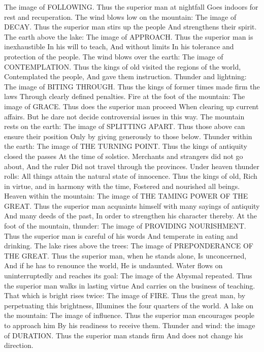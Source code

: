 {The image of FOLLOWING.
Thus the superior man at nightfall
Goes indoors for rest and recuperation.
\or
The wind blows low on the mountain:
The image of DECAY.
Thus the superior man stirs up the people
And strengthens their spirit.
\or
The earth above the lake:
The image of APPROACH.
Thus the superior man is inexhaustible
In his will to teach,
And without limits
In his tolerance and protection of the people.
\or
The wind blows over the earth:
The image of CONTEMPLATION.
Thus the kings of old visited the regions of the world,
Contemplated the people,
And gave them instruction.
\or
Thunder and lightning:
The image of BITING THROUGH.
Thus the kings of former times made firm the laws
Through clearly defined penalties.
\or
Fire at the foot of the mountain:
The image of GRACE.
Thus does the superior man proceed
When clearing up current affairs.
But he dare not decide controversial issues in this way.
\or
The mountain rests on the earth:
The image of SPLITTING APART.
Thus those above can ensure their position
Only by giving generously to those below.
\or
Thunder within the earth:
The image of THE TURNING POINT.
Thus the kings of antiquity closed the passes
At the time of solstice.
Merchants and strangers did not go about,
And the ruler
Did not travel through the provinces.
\or
Under heaven thunder rolls:
All things attain the natural state of innocence.
Thus the kings of old,
Rich in virtue, and in harmony with the time,
Fostered and nourished all beings.
\or
Heaven within the mountain:
The image of THE TAMING POWER OF
THE GREAT.
Thus the superior man acquaints himself with many sayings of antiquity
And many deeds of the past,
In order to strengthen his character thereby.
\or
At the foot of the mountain, thunder:
The image of PROVIDING
NOURISHMENT.
Thus the superior man is careful of his words
And temperate in eating and drinking.
\or
The lake rises above the trees:
The image of PREPONDERANCE OF
THE GREAT.
Thus the superior man, when he stands alone,
Is unconcerned,
And if he has to renounce the world,
He is undaunted.
\or
Water flows on uninterruptedly and reaches its goal:
The image of the Abysmal repeated.
Thus the superior man walks in lasting virtue
And carries on the business of teaching.
\or
That which is bright rises twice:
The image of FIRE.
Thus the great man, by perpetuating this brightness,
Illumines the four quarters of the world.
\or
A lake on the mountain:
The image of influence.
Thus the superior man encourages people to approach him
By his readiness to receive them.
\or
Thunder and wind: the image of
DURATION.
Thus the superior man stands firm
And does not change his direction.
}
